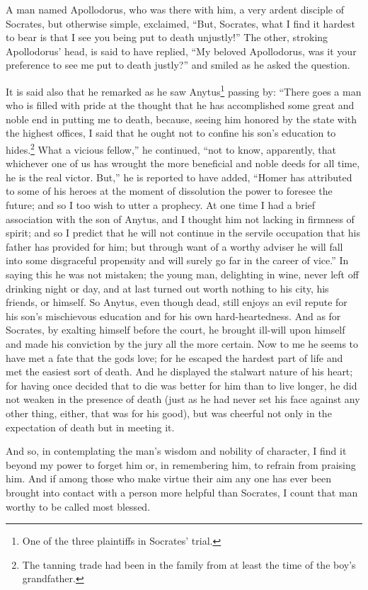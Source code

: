 \documentclass[12pt]{article}
\begin{document}
A man named Apollodorus, who was there with him, a very ardent disciple of
Socrates, but otherwise simple, exclaimed, ``But, Socrates, what I find it
hardest to bear is that I see you being put to death unjustly!'' The other,
stroking Apollodorus' head, is said to have replied, ``My beloved Apollodorus,
was it your preference to see me put to death justly?'' and smiled as he asked
the question.

It is said also that he remarked as he saw Anytus\footnote{One of the three
plaintiffs in Socrates' trial.} passing by: ``There goes a man who is filled
with pride at the thought that he has accomplished some great and noble end in
putting me to death, because, seeing him honored by the state with the highest
offices, I said that he ought not to confine his son's education to
hides.\footnote{The tanning trade had been in the family from at least the time
of the boy's grandfather.} What a vicious fellow,'' he continued, ``not to
know, apparently, that whichever one of us has wrought the more beneficial and
noble deeds for all time, he is the real victor. But,'' he is reported to have
added, ``Homer has attributed to some of his heroes at the moment of
dissolution the power to foresee the future; and so I too wish to utter a
prophecy. At one time I had a brief association with the son of Anytus, and I
thought him not lacking in firmness of spirit; and so I predict that he will
not continue in the servile occupation that his father has provided for him;
but through want of a worthy adviser he will fall into some disgraceful
propensity and will surely go far in the career of vice.'' In saying this he
was not mistaken; the young man, delighting in wine, never left off drinking
night or day, and at last turned out worth nothing to his city, his friends, or
himself. So Anytus, even though dead, still enjoys an evil repute for his son's
mischievous education and for his own hard-heartedness. And as for Socrates, by
exalting himself before the court, he brought ill-will upon himself and made
his conviction by the jury all the more certain. Now to me he seems to have met
a fate that the gods love; for he escaped the hardest part of life and met the
easiest sort of death. And he displayed the stalwart nature of his heart; for
having once decided that to die was better for him than to live longer, he did
not weaken in the presence of death (just as he had never set his face against
any other thing, either, that was for his good), but was cheerful not only in
the expectation of death but in meeting it.

And so, in contemplating the man's wisdom and nobility of character, I find it
beyond my power to forget him or, in remembering him, to refrain from praising
him. And if among those who make virtue their aim any one has ever been brought
into contact with a person more helpful than Socrates, I count that man worthy
to be called most blessed.
\end{document}
